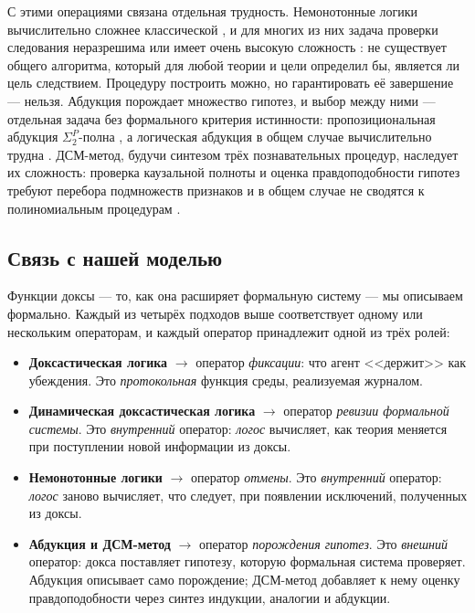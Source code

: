 \documentclass[12pt,a4paper]{article}
\begin{document}
С этими операциями связана отдельная трудность. Немонотонные логики вычислительно
сложнее классической \cite{vinkov}, и для многих из них задача проверки следования
неразрешима или имеет очень высокую сложность \cite{cadoli}: не существует общего
алгоритма, который для любой теории и цели определил бы, является ли цель
следствием. Процедуру построить можно, но гарантировать её завершение --- нельзя.
Абдукция порождает множество гипотез, и выбор между ними --- отдельная задача без
формального критерия истинности: пропозициональная абдукция $\Sigma_2^P$-полна
\cite{eiter95b}, а логическая абдукция в общем случае вычислительно трудна
\cite{eiter95}. ДСМ-метод, будучи синтезом трёх познавательных процедур, наследует
их сложность: проверка каузальной полноты и оценка правдоподобности гипотез требуют
перебора подмножеств признаков и в общем случае не сводятся к полиномиальным
процедурам \cite{finn_dsm}.

\subsection{Связь с нашей моделью}
\label{sec:theory_model}

Функции доксы --- то, как она расширяет формальную систему --- мы описываем
формально. Каждый из четырёх подходов выше соответствует одному или нескольким
операторам, и каждый оператор принадлежит одной из трёх ролей:

\begin{itemize}
	\item \textbf{Доксастическая логика} $\to$ оператор \emph{фиксации}:
	      что агент <<держит>> как убеждения. Это \emph{протокольная}
		  функция среды, реализуемая журналом.
	\item \textbf{Динамическая доксастическая логика} $\to$ оператор
	      \emph{ревизии формальной системы}. Это \emph{внутренний} оператор:
		  \emph{логос} вычисляет, как теория меняется при поступлении новой
		  информации из доксы.
	\item \textbf{Немонотонные логики} $\to$ оператор \emph{отмены}. Это
	      \emph{внутренний} оператор: \emph{логос} заново вычисляет, что следует,
		  при появлении исключений, полученных из доксы.
	\item \textbf{Абдукция и ДСМ-метод} $\to$ оператор \emph{порождения гипотез}.
	      Это \emph{внешний} оператор: докса поставляет гипотезу, которую формальная
		  система проверяет. Абдукция описывает само порождение; ДСМ-метод добавляет
		  к нему оценку правдоподобности через синтез индукции, аналогии и абдукции.
\end{itemize}
\end{document}
